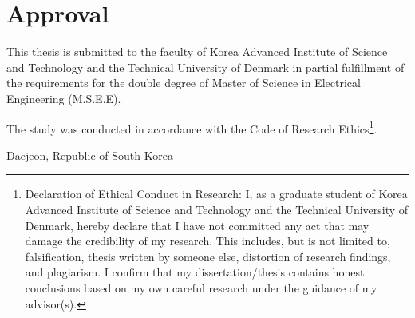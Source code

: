 \thispagestyle{main}

\chapter*{Approval}
This thesis is submitted to the faculty of Korea Advanced Institute of Science and Technology and the Technical University of Denmark in partial fulfillment of the requirements for the double degree of Master of Science in Electrical Engineering (M.S.E.E).
\vfill
\begin{center}
The study was conducted in accordance with the Code of Research Ethics\footnote{Declaration of Ethical Conduct in Research: I, as a graduate student of Korea Advanced Institute of Science and Technology and the Technical University of Denmark, hereby declare that I have not committed any act that may damage the credibility of my research. This includes, but is not limited to, falsification, thesis written by someone else, distortion of research findings, and plagiarism. I confirm that my dissertation/thesis contains honest conclusions based on my own careful research under the guidance of my advisor(s).}. \vspace{1cm}

Daejeon, Republic of South Korea \\

\end{center}
\thispagestyle{empty}
\vfill

